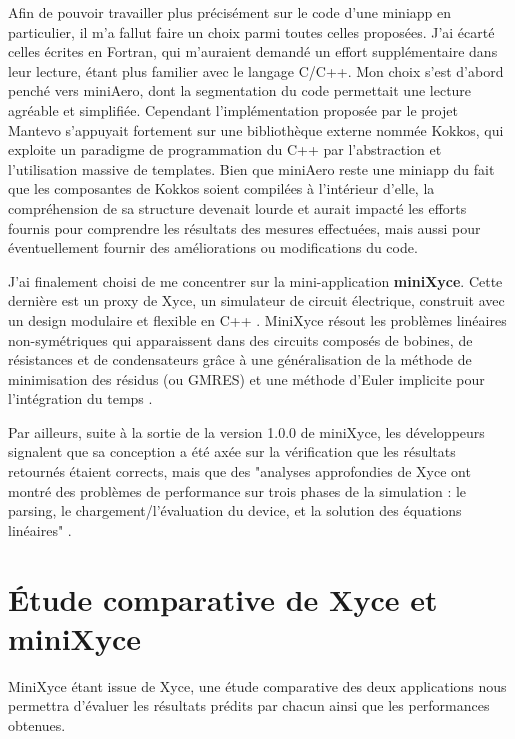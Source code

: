 \documentclass[11pt,a4paper,oneside]{memoir}
\theoremstyle{definition}
\theoremstyle{remark}
\theoremstyle{plain}
\begin{document}
Afin de pouvoir travailler plus précisément sur le code d'une miniapp en particulier, il m'a fallut faire un choix parmi toutes celles proposées. J'ai écarté celles écrites en Fortran, qui m'auraient demandé un effort supplémentaire dans leur lecture, étant plus familier avec le langage C/C++. Mon choix s'est d'abord penché vers miniAero, dont la segmentation du code permettait une lecture agréable et simplifiée. Cependant l'implémentation proposée par le projet Mantevo \cite{miniaero-code} s'appuyait fortement sur une bibliothèque externe nommée Kokkos, qui exploite un paradigme de programmation du C++ par l'abstraction et l'utilisation massive de templates. Bien que miniAero reste une miniapp du fait que les composantes de Kokkos soient compilées à l'intérieur d'elle, la compréhension de sa structure devenait lourde et aurait impacté les efforts fournis pour comprendre les résultats des mesures effectuées, mais aussi pour éventuellement fournir des améliorations ou modifications du code.\bigskip

J'ai finalement choisi de me concentrer sur la mini-application \textbf{miniXyce}. Cette dernière est un proxy de Xyce, un simulateur de circuit électrique, construit avec un design modulaire et flexible en C++ \cite{xyce}. MiniXyce résout les problèmes linéaires non-symétriques qui apparaissent dans des circuits composés de bobines, de résistances et de condensateurs grâce à une généralisation de la méthode de minimisation des résidus (ou GMRES) et une méthode d'Euler implicite pour l'intégration du temps \cite{minixyce-code}.

Par ailleurs, suite à la sortie de la version 1.0.0 de miniXyce, les développeurs signalent que sa conception a été axée sur la vérification que les résultats retournés étaient corrects, mais que des "analyses approfondies de Xyce ont montré des problèmes de performance sur trois phases de la simulation : le parsing, le chargement/l'évaluation du device, et la solution des équations linéaires" \cite{minixyce-code}.









\chapter{\'Etude comparative de Xyce et miniXyce}

MiniXyce étant issue de Xyce, une étude comparative des deux applications nous permettra d'évaluer les résultats prédits par chacun ainsi que les performances obtenues.
\end{document}
